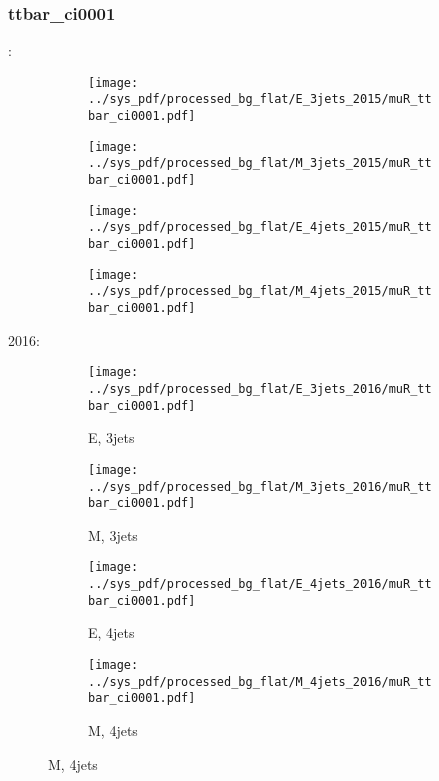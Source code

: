 \documentclass{beamer}
\begin{document}
\begin{frame}
\frametitle{ttbar_ci0001}
\fontsize{5}{1}:
\begin{figure}
\centering
\begin{subfigure}[b]{0.24\textwidth}
\texttt{[image: ../sys\_pdf/processed\_bg\_flat/E\_3jets\_2015/muR\_ttbar\_ci0001.pdf]}
\end{subfigure}
\begin{subfigure}[b]{0.24\textwidth}
\texttt{[image: ../sys\_pdf/processed\_bg\_flat/M\_3jets\_2015/muR\_ttbar\_ci0001.pdf]}
\end{subfigure}
\begin{subfigure}[b]{0.24\textwidth}
\texttt{[image: ../sys\_pdf/processed\_bg\_flat/E\_4jets\_2015/muR\_ttbar\_ci0001.pdf]}
\end{subfigure}
\begin{subfigure}[b]{0.24\textwidth}
\texttt{[image: ../sys\_pdf/processed\_bg\_flat/M\_4jets\_2015/muR\_ttbar\_ci0001.pdf]}
\end{subfigure}
\end{figure}
2016:
\begin{figure}
\centering
\begin{subfigure}[b]{0.24\textwidth}
\texttt{[image: ../sys\_pdf/processed\_bg\_flat/E\_3jets\_2016/muR\_ttbar\_ci0001.pdf]}
\captionsetup{font=tiny}
\caption{E, 3jets}
\end{subfigure}
\begin{subfigure}[b]{0.24\textwidth}
\texttt{[image: ../sys\_pdf/processed\_bg\_flat/M\_3jets\_2016/muR\_ttbar\_ci0001.pdf]}
\captionsetup{font=tiny}
\caption{M, 3jets}
\end{subfigure}
\begin{subfigure}[b]{0.24\textwidth}
\texttt{[image: ../sys\_pdf/processed\_bg\_flat/E\_4jets\_2016/muR\_ttbar\_ci0001.pdf]}
\captionsetup{font=tiny}
\caption{E, 4jets}
\end{subfigure}
\begin{subfigure}[b]{0.24\textwidth}
\texttt{[image: ../sys\_pdf/processed\_bg\_flat/M\_4jets\_2016/muR\_ttbar\_ci0001.pdf]}
\captionsetup{font=tiny}
\caption{M, 4jets}
\end{subfigure}
\end{figure}
\end{frame}
\end{document}
